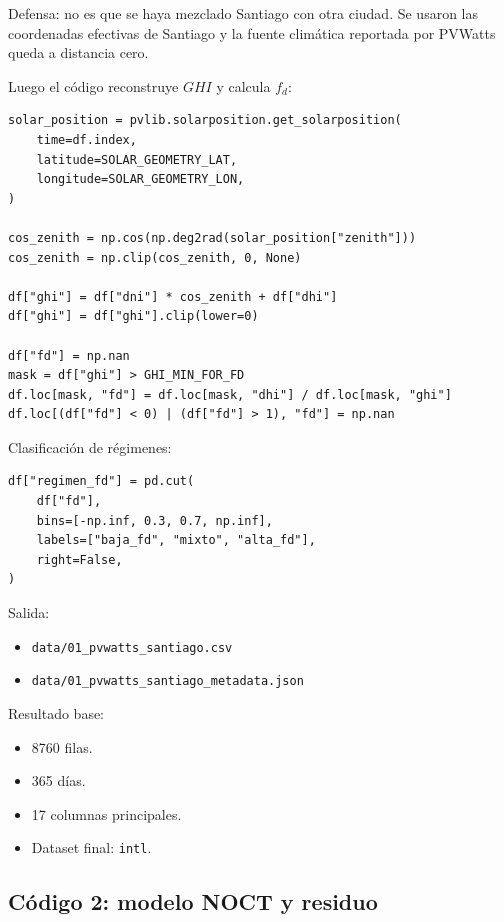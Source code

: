 \documentclass[11pt, letterpaper]{article}
\newcommand{\fd}{f_d}
\begin{document}
Defensa: no es que se haya mezclado Santiago con otra ciudad. Se usaron las coordenadas efectivas de Santiago y la fuente clim\'atica reportada por PVWatts queda a distancia cero.

Luego el c\'odigo reconstruye \(GHI\) y calcula \(\fd\):

\begin{lstlisting}[style=pythonstyle]
solar_position = pvlib.solarposition.get_solarposition(
    time=df.index,
    latitude=SOLAR_GEOMETRY_LAT,
    longitude=SOLAR_GEOMETRY_LON,
)

cos_zenith = np.cos(np.deg2rad(solar_position["zenith"]))
cos_zenith = np.clip(cos_zenith, 0, None)

df["ghi"] = df["dni"] * cos_zenith + df["dhi"]
df["ghi"] = df["ghi"].clip(lower=0)

df["fd"] = np.nan
mask = df["ghi"] > GHI_MIN_FOR_FD
df.loc[mask, "fd"] = df.loc[mask, "dhi"] / df.loc[mask, "ghi"]
df.loc[(df["fd"] < 0) | (df["fd"] > 1), "fd"] = np.nan
\end{lstlisting}

Clasificaci\'on de r\'egimenes:

\begin{lstlisting}[style=pythonstyle]
df["regimen_fd"] = pd.cut(
    df["fd"],
    bins=[-np.inf, 0.3, 0.7, np.inf],
    labels=["baja_fd", "mixto", "alta_fd"],
    right=False,
)
\end{lstlisting}

Salida:

\begin{itemize}
    \item \texttt{data/01\_pvwatts\_santiago.csv}
    \item \texttt{data/01\_pvwatts\_santiago\_metadata.json}
\end{itemize}

Resultado base:

\begin{itemize}
    \item 8760 filas.
    \item 365 d\'ias.
    \item 17 columnas principales.
    \item Dataset final: \texttt{intl}.
\end{itemize}

\subsection{C\'odigo 2: modelo NOCT y residuo}
\end{document}
